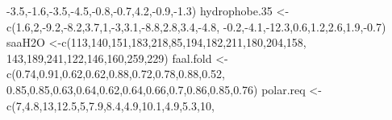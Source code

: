 \documentclass[
]{book}
\newenvironment{Shaded}{\begin{snugshade}}{\end{snugshade}}
\newcommand{\DecValTok}[1]{\textcolor[rgb]{0.00,0.00,0.81}{#1}}
\newcommand{\FloatTok}[1]{\textcolor[rgb]{0.00,0.00,0.81}{#1}}
\newcommand{\FunctionTok}[1]{\textcolor[rgb]{0.00,0.00,0.00}{#1}}
\newcommand{\NormalTok}[1]{#1}
\newcommand{\OtherTok}[1]{\textcolor[rgb]{0.56,0.35,0.01}{#1}}
\newcommand{\SpecialCharTok}[1]{\textcolor[rgb]{0.00,0.00,0.00}{#1}}
\begin{document}
\begin{Shaded}
\begin{Highlighting}[]
                  \SpecialCharTok{{-}}\FloatTok{3.5}\NormalTok{,}\SpecialCharTok{{-}}\FloatTok{1.6}\NormalTok{,}\SpecialCharTok{{-}}\FloatTok{3.5}\NormalTok{,}\SpecialCharTok{{-}}\FloatTok{4.5}\NormalTok{,}\SpecialCharTok{{-}}\FloatTok{0.8}\NormalTok{,}\SpecialCharTok{{-}}\FloatTok{0.7}\NormalTok{,}\FloatTok{4.2}\NormalTok{,}\SpecialCharTok{{-}}\FloatTok{0.9}\NormalTok{,}\SpecialCharTok{{-}}\FloatTok{1.3}\NormalTok{)}
\NormalTok{hydrophobe}\FloatTok{.35} \OtherTok{\textless{}{-}}\FunctionTok{c}\NormalTok{(}\FloatTok{1.6}\NormalTok{,}\DecValTok{2}\NormalTok{,}\SpecialCharTok{{-}}\FloatTok{9.2}\NormalTok{,}\SpecialCharTok{{-}}\FloatTok{8.2}\NormalTok{,}\FloatTok{3.7}\NormalTok{,}\DecValTok{1}\NormalTok{,}\SpecialCharTok{{-}}\DecValTok{3}\NormalTok{,}\FloatTok{3.1}\NormalTok{,}\SpecialCharTok{{-}}\FloatTok{8.8}\NormalTok{,}\FloatTok{2.8}\NormalTok{,}\FloatTok{3.4}\NormalTok{,}\SpecialCharTok{{-}}\FloatTok{4.8}\NormalTok{,}
                  \SpecialCharTok{{-}}\FloatTok{0.2}\NormalTok{,}\SpecialCharTok{{-}}\FloatTok{4.1}\NormalTok{,}\SpecialCharTok{{-}}\FloatTok{12.3}\NormalTok{,}\FloatTok{0.6}\NormalTok{,}\FloatTok{1.2}\NormalTok{,}\FloatTok{2.6}\NormalTok{,}\FloatTok{1.9}\NormalTok{,}\SpecialCharTok{{-}}\FloatTok{0.7}\NormalTok{)}
\NormalTok{saaH2O       }\OtherTok{\textless{}{-}}\FunctionTok{c}\NormalTok{(}\DecValTok{113}\NormalTok{,}\DecValTok{140}\NormalTok{,}\DecValTok{151}\NormalTok{,}\DecValTok{183}\NormalTok{,}\DecValTok{218}\NormalTok{,}\DecValTok{85}\NormalTok{,}\DecValTok{194}\NormalTok{,}\DecValTok{182}\NormalTok{,}\DecValTok{211}\NormalTok{,}\DecValTok{180}\NormalTok{,}\DecValTok{204}\NormalTok{,}\DecValTok{158}\NormalTok{,}
                 \DecValTok{143}\NormalTok{,}\DecValTok{189}\NormalTok{,}\DecValTok{241}\NormalTok{,}\DecValTok{122}\NormalTok{,}\DecValTok{146}\NormalTok{,}\DecValTok{160}\NormalTok{,}\DecValTok{259}\NormalTok{,}\DecValTok{229}\NormalTok{)}
\NormalTok{faal.fold    }\OtherTok{\textless{}{-}}\FunctionTok{c}\NormalTok{(}\FloatTok{0.74}\NormalTok{,}\FloatTok{0.91}\NormalTok{,}\FloatTok{0.62}\NormalTok{,}\FloatTok{0.62}\NormalTok{,}\FloatTok{0.88}\NormalTok{,}\FloatTok{0.72}\NormalTok{,}\FloatTok{0.78}\NormalTok{,}\FloatTok{0.88}\NormalTok{,}\FloatTok{0.52}\NormalTok{,}
                 \FloatTok{0.85}\NormalTok{,}\FloatTok{0.85}\NormalTok{,}\FloatTok{0.63}\NormalTok{,}\FloatTok{0.64}\NormalTok{,}\FloatTok{0.62}\NormalTok{,}\FloatTok{0.64}\NormalTok{,}\FloatTok{0.66}\NormalTok{,}\FloatTok{0.7}\NormalTok{,}\FloatTok{0.86}\NormalTok{,}\FloatTok{0.85}\NormalTok{,}\FloatTok{0.76}\NormalTok{)}
\NormalTok{polar.req    }\OtherTok{\textless{}{-}}\FunctionTok{c}\NormalTok{(}\DecValTok{7}\NormalTok{,}\FloatTok{4.8}\NormalTok{,}\DecValTok{13}\NormalTok{,}\FloatTok{12.5}\NormalTok{,}\DecValTok{5}\NormalTok{,}\FloatTok{7.9}\NormalTok{,}\FloatTok{8.4}\NormalTok{,}\FloatTok{4.9}\NormalTok{,}\FloatTok{10.1}\NormalTok{,}\FloatTok{4.9}\NormalTok{,}\FloatTok{5.3}\NormalTok{,}\DecValTok{10}\NormalTok{,}

\end{Highlighting}
\end{Shaded}
\end{document}
